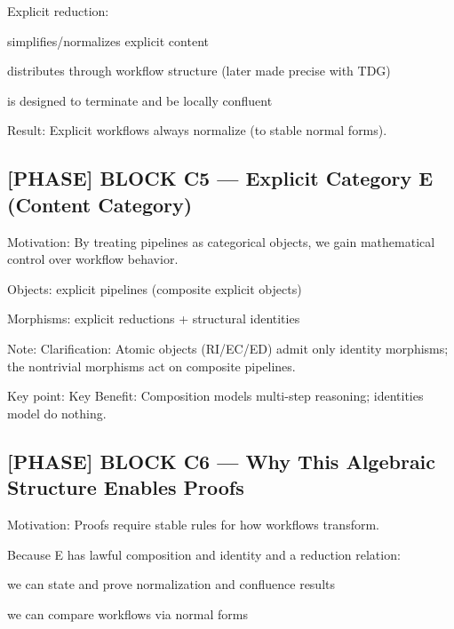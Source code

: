 Explicit reduction:\par

simplifies/normalizes explicit content\par

distributes through workflow structure (later made precise with TDG)\par

is designed to terminate and be locally confluent\par

 Result: Explicit workflows always normalize (to stable normal forms).\par

\subsection*{[PHASE] BLOCK C5 --- Explicit Category E (Content Category)}

Motivation: By treating pipelines as categorical objects, we gain mathematical control over workflow behavior.\par

Objects: explicit pipelines (composite explicit objects)\par

Morphisms: explicit reductions + structural identities\par

Note: Clarification: Atomic objects (RI/EC/ED) admit only identity morphisms; the nontrivial morphisms act on composite pipelines.\par

Key point: Key Benefit: Composition models multi-step reasoning; identities model do nothing. \par

\subsection*{[PHASE] BLOCK C6 --- Why This Algebraic Structure Enables Proofs}

Motivation: Proofs require stable rules for how workflows transform.\par

Because E has lawful composition and identity and a reduction relation:\par

we can state and prove normalization and confluence results\par

we can compare workflows via normal forms\par

